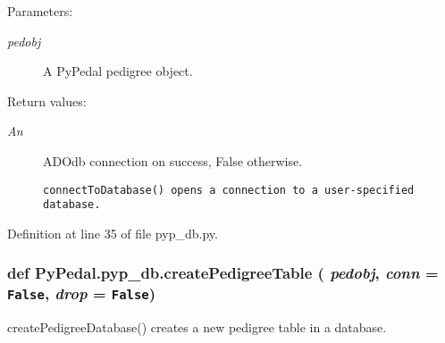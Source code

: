 \begin{Desc}
\item[Parameters:]
\begin{description}
\item[{\em pedobj}]A Py\-Pedal pedigree object. \end{description}
\end{Desc}
\begin{Desc}
\item[Return values:]
\begin{description}
\item[{\em An}]ADOdb connection on success, False otherwise.

\footnotesize\begin{verbatim}connectToDatabase() opens a connection to a user-specified database.
\end{verbatim}
\normalsize
 \end{description}
\end{Desc}


Definition at line 35 of file pyp\_\-db.py.\hypertarget{namespacePyPedal_1_1pyp__db_7c8d70a4ec6c7f537291d79fb4118573}{
\subsubsection[createPedigreeTable]{\setlength{\rightskip}{0pt plus 5cm}def Py\-Pedal.pyp\_\-db.create\-Pedigree\-Table ( {\em pedobj},  {\em conn} = {\tt False},  {\em drop} = {\tt False})}}
\label{namespacePyPedal_1_1pyp__db_7c8d70a4ec6c7f537291d79fb4118573}


create\-Pedigree\-Database() creates a new pedigree table in a database. 

